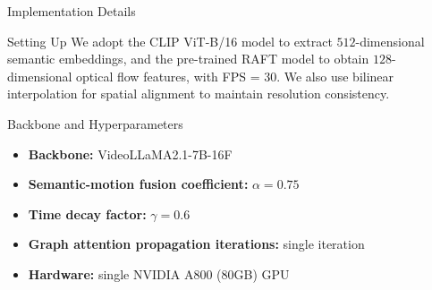 \documentclass[aspectratio=169,xcolor=dvipsnames]{beamer}
\begin{document}
	\begin{frame}{Implementation Details}
		\small
		
		\begin{block}{Setting Up}
			We adopt the CLIP ViT-B/16 model to extract $512$-dimensional semantic embeddings, and the pre-trained RAFT model to obtain $128$-dimensional optical flow features, with FPS = 30. We also use bilinear interpolation for spatial alignment to maintain resolution consistency.
		\end{block}
		
		\begin{block}{Backbone and Hyperparameters}
			\begin{itemize}
				\item \textbf{Backbone:} VideoLLaMA2.1-7B-16F
				\item \textbf{Semantic-motion fusion coefficient:} $\alpha = 0.75$
				\item \textbf{Time decay factor:} $\gamma = 0.6$
				\item \textbf{Graph attention propagation iterations:} single iteration
				\item \textbf{Hardware:} single NVIDIA A800 (80GB) GPU
			\end{itemize}
		\end{block}
		
		
	\end{frame}
	
\end{document}
